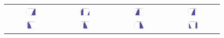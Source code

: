 \begin{figure}[h]
\begin{tabular}{cccc}
	   \\
	   \hline
	   \\
	   \includegraphics[width=0.23\textwidth]{fig/double_1_forces_0} &
	   \includegraphics[width=0.23\textwidth]{fig/double_1_forces_pi_2} &
	   \includegraphics[width=0.23\textwidth]{fig/double_1_forces_pi} &
	   \includegraphics[width=0.23\textwidth]{fig/double_1_forces_3pi_2} \\
	   \includegraphics[width=0.23\textwidth]{fig/double_2_forces_0} &
	   \includegraphics[width=0.23\textwidth]{fig/double_2_forces_pi_2} &
	   \includegraphics[width=0.23\textwidth]{fig/double_2_forces_pi} &
	   \includegraphics[width=0.23\textwidth]{fig/double_2_forces_3pi_2} \\

\end{tabular}
\end{figure}
